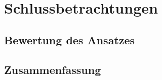 \chapter{Schlussbetrachtungen}

\section{Bewertung des Ansatzes}



\section{Zusammenfassung}

























